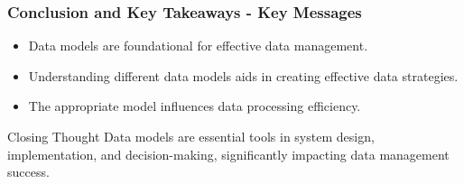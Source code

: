 \documentclass[aspectratio=169]{beamer}
\begin{document}
\begin{frame}[fragile]
    \frametitle{Conclusion and Key Takeaways - Key Messages}
    \begin{itemize}
        \item Data models are foundational for effective data management.
        \item Understanding different data models aids in creating effective data strategies.
        \item The appropriate model influences data processing efficiency.
    \end{itemize}

    \begin{block}{Closing Thought}
        Data models are essential tools in system design, implementation, and decision-making, significantly impacting data management success.
    \end{block}
\end{frame}
\end{document}
